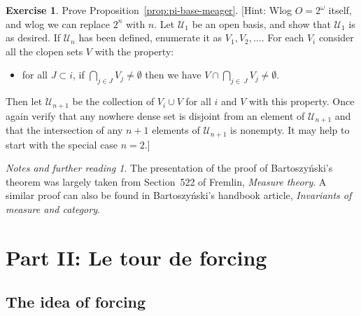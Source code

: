 \documentclass[11pt,oneside]{amsbook}
\theoremstyle{definition}
\newtheorem{exerc}{Exercise}[section]
\theoremstyle{plain}
\theoremstyle{definition}
\theoremstyle{remark}
\newtheorem*{notes}{Notes and further reading}
\begin{document}
\begin{exerc}
  \label{exerc:pi-base-meager}
  Prove Proposition~\ref{prop:pi-base-meager}. [Hint: Wlog $O=2^\omega$ itself, and wlog we can replace $2^n$ with $n$. Let $\mathcal U_1$ be an open basis, and show that $\mathcal U_1$ is as desired. If $\mathcal U_n$ has been defined, enumerate it as $V_1,V_2,\ldots$. For each $V_i$ consider all the clopen sets $V$ with the property:
  \begin{itemize}
  \item for all $J\subset i$, if $\bigcap_{j\in J}V_j\neq\emptyset$ then we have $V\cap\bigcap_{j\in\ J}V_j\neq\emptyset$.
  \end{itemize}
  Then let $\mathcal U_{n+1}$ be the collection of $V_i\cup V$ for all $i$ and $V$ with this property. Once again verify that any nowhere dense set is disjoint from an element of $\mathcal U_{n+1}$ and that the intersection of any $n+1$ elements of $\mathcal U_{n+1}$ is nonempty. It may help to start with the special case $n=2$.]
\end{exerc}

\begin{notes}
  The presentation of the proof of Bartoszy\'nski's theorem was largely taken from Section~522 of Fremlin, \emph{Measure theory}. A similar proof can also be found in Bartoszy\'nski's handbook article, \emph{Invariants of measure and category}.
\end{notes}


\chapter*{Part II: Le tour de forcing}






\section{The idea of forcing}
\end{document}
